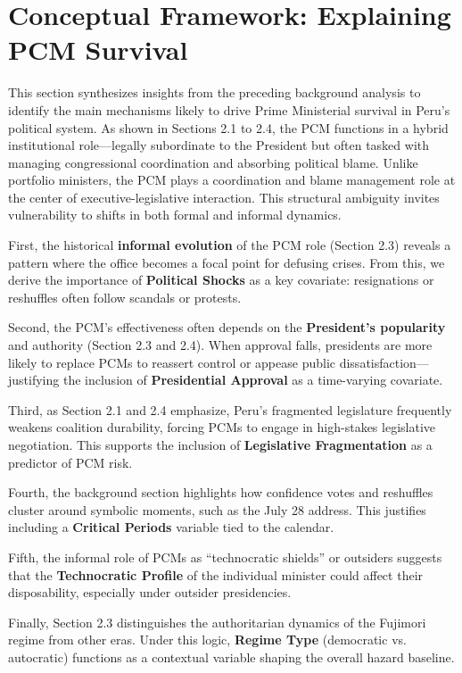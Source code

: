 \documentclass[a4paper, 12pt]{article}
\begin{document}
\section{Conceptual Framework: Explaining PCM Survival}\label{concepframe}

This section synthesizes insights from the preceding background analysis to identify the main mechanisms likely to drive Prime Ministerial survival in Peru's political system. As shown in Sections 2.1 to 2.4, the PCM functions in a hybrid institutional role—legally subordinate to the President but often tasked with managing congressional coordination and absorbing political blame. Unlike portfolio ministers, the PCM plays a coordination and blame management role at the center of executive-legislative interaction. This structural ambiguity invites vulnerability to shifts in both formal and informal dynamics.

First, the historical \textbf{informal evolution} of the PCM role (Section 2.3) reveals a pattern where the office becomes a focal point for defusing crises. From this, we derive the importance of \textbf{Political Shocks} as a key covariate: resignations or reshuffles often follow scandals or protests.

Second, the PCM’s effectiveness often depends on the \textbf{President's popularity} and authority (Section 2.3 and 2.4). When approval falls, presidents are more likely to replace PCMs to reassert control or appease public dissatisfaction---justifying the inclusion of \textbf{Presidential Approval} as a time-varying covariate.

Third, as Section 2.1 and 2.4 emphasize, Peru’s fragmented legislature frequently weakens coalition durability, forcing PCMs to engage in high-stakes legislative negotiation. This supports the inclusion of \textbf{Legislative Fragmentation} as a predictor of PCM risk.

Fourth, the background section highlights how confidence votes and reshuffles cluster around symbolic moments, such as the July 28 address. This justifies including a \textbf{Critical Periods} variable tied to the calendar.

Fifth, the informal role of PCMs as ``technocratic shields'' or outsiders suggests that the \textbf{Technocratic Profile} of the individual minister could affect their disposability, especially under outsider presidencies.

Finally, Section 2.3 distinguishes the authoritarian dynamics of the Fujimori regime from other eras. Under this logic, \textbf{Regime Type} (democratic vs. autocratic) functions as a contextual variable shaping the overall hazard baseline.
\end{document}
